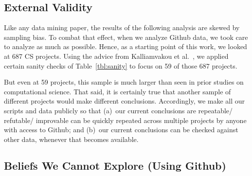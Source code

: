 \documentclass[sigconf,review,anonymous]{acmart}
\begin{document}
 
 




  





\subsection{External Validity}
Like any data mining paper,
the results of the following analysis are skewed by sampling bias.
To combat that effect, when we analyze Github data, we took care to analyze as much as possible.
Hence,
as a starting point of this work, we looked at 687 CS projects. 
Using the advice from Kalliamvakou et al.~\cite{Kalliamvakou:2014}, we applied certain sanity checks of Table~\ref{tbl:sanity}  to focus on 59 of those 687 projects.

But even at 59 projects, this sample is much larger than seen in prior studies on computational
science. That said, it is certainly true that another sample of different projects would make different conclusions.
Accordingly, we make all our scripts and data publicly so that
(a)~our current conclusions
are repeatable/ refutable/ improvable can be quickly repeated across multiple projects by anyone with access to Github; and (b)~our current conclusions can be checked against other data, whenever that becomes available.




\subsection{Beliefs We Cannot Explore (Using Github)}
\end{document}
